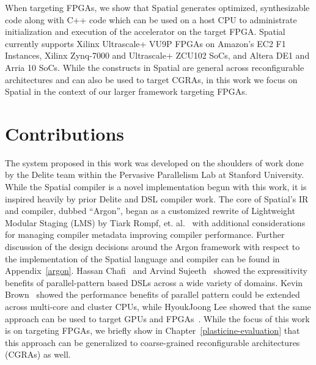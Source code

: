 When targeting FPGAs, we show that Spatial generates optimized, synthesizable
code along with C++ code which can be used on a host CPU to administrate
initialization and execution of the accelerator on the target FPGA.
Spatial currently supports Xilinx Ultrascale+ VU9P FPGAs on Amazon's
EC2 F1 Instances, Xilinx Zynq-7000 and Ultrascale+ ZCU102 SoCs, and Altera DE1 and Arria 10 SoCs.
While the constructs in Spatial are general across reconfigurable architectures
and can also be used to target CGRAs, in this work we focus on Spatial in the
context of our larger framework targeting FPGAs.

\section{Contributions}
The system proposed in this work was developed on the shoulders of work done by
the Delite team within the Pervasive Parallelism Lab at Stanford University.
While the Spatial compiler is a novel implementation begun with this work, it
is inspired heavily by prior Delite and DSL compiler work.
The core of Spatial's IR and compiler,
dubbed ``Argon'', began as a customized rewrite of Lightweight Modular Staging (LMS)
by Tiark Rompf, et. al.~\cite{tiark-thesis,lms} with additional considerations for managing
compiler metadata improving compiler performance.
Further discussion of the design decisions around the Argon framework with respect
to the implementation of the Spatial language and compiler can be found in Appendix~\ref{argon}.
Hassan Chafi~\cite{hassan-thesis} and
Arvind Sujeeth~\cite{arvind-thesis} showed the expressitivity benefits of
parallel-pattern based DSLs across a wide variety of domains.
Kevin Brown~\cite{kevin-thesis}
showed the performance benefits of parallel pattern
could be extended across multi-core and cluster CPUs, while
HyoukJoong Lee showed that the same approach can be used to target GPUs
and FPGAs~\cite{hj-thesis}. While the focus of this work is on targeting FPGAs,
we briefly show in Chapter~\ref{plasticine-evaluation} that this approach
can be generalized to coarse-grained reconfigurable architectures (CGRAs) as well.

